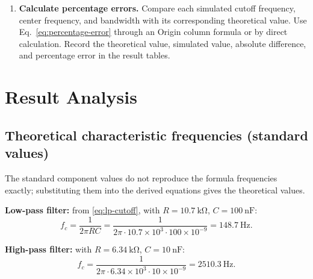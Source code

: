 \documentclass[12pt,a4paper]{article}
\begin{document}
\begin{enumerate}[leftmargin=0.8cm,label=\textbf{Step \arabic*:},itemsep=0.55em]
		\item \textbf{Calculate percentage errors.}
		Compare each simulated cutoff frequency, center frequency, and bandwidth with its corresponding theoretical value. Use Eq.~\eqref{eq:percentage-error} through an Origin column formula or by direct calculation. Record the theoretical value, simulated value, absolute difference, and percentage error in the result tables.
	\end{enumerate}
	
	\section{Result Analysis}
	\subsection{Theoretical characteristic frequencies (standard values)}
	The standard component values do not reproduce the formula frequencies
	exactly; substituting them into the derived equations gives the
	theoretical values.
	
	\textbf{Low-pass filter:} from \eqref{eq:lp-cutoff}, with
	$R = \SI{10.7}{\kilo\ohm}$, $C = \SI{100}{\nano\farad}$:
	\begin{equation}
		f_{c} = \frac{1}{2\pi RC}
		= \frac{1}{2\pi \cdot 10.7\times 10^{3} \cdot 100\times 10^{-9}}
		= \SI{148.7}{\hertz}.
		\label{eq:calc-lp}
	\end{equation}
	
	\textbf{High-pass filter:} with $R = \SI{6.34}{\kilo\ohm}$,
	$C = \SI{10}{\nano\farad}$:
	\begin{equation}
		f_{c} = \frac{1}{2\pi \cdot 6.34\times 10^{3} \cdot 10\times 10^{-9}}
		= \SI{2510.3}{\hertz}.
		\label{eq:calc-hp}
	\end{equation}
	
\end{document}
